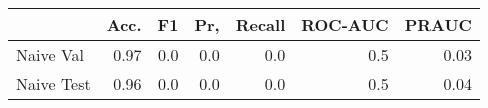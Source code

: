 \begin{tabular}{lrrrrrr}
\toprule
{} &  Acc. &   F1 &  Pr, &  Recall &  ROC-AUC &  PRAUC \\
\midrule
Naive Val  &  0.97 &  0.0 &  0.0 &     0.0 &      0.5 &   0.03 \\
Naive Test &  0.96 &  0.0 &  0.0 &     0.0 &      0.5 &   0.04 \\
\bottomrule
\end{tabular}
